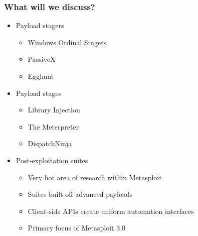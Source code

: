 \documentclass{beamer}
\newenvironment{sitemize}{\vspace{1mm}\begin{itemize}\itemsep 4pt\small}{\end{itemize}}
\begin{document}
\begin{frame}[t]
    \frametitle{What will we discuss?}

    \begin{sitemize}
        \item Payload stagers
        \begin{sitemize}
            \item Windows Ordinal Stagers
            \item PassiveX
            \item Egghunt
        \end{sitemize}

        \pause
        \item Payload stages
        \begin{sitemize}
            \item Library Injection
            \item The Meterpreter
            \item DispatchNinja
        \end{sitemize}

        \pause
        \item Post-exploitation suites
        \begin{sitemize}
            \item Very hot area of research within Metasploit
            \item Suites built off advanced payloads
            \item Client-side APIs create uniform automation interfaces
            \item Primary focus of Metasploit 3.0
        \end{sitemize}
    \end{sitemize}
\end{frame}
\end{document}
